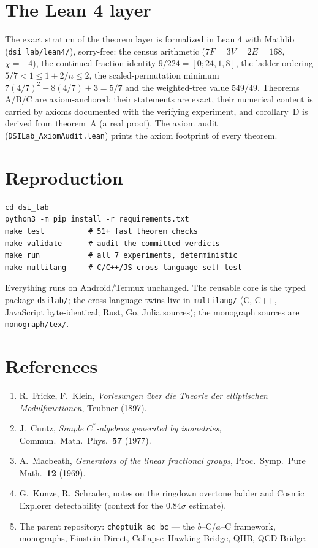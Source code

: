 \documentclass[11pt,a4paper]{article}
\theoremstyle{definition}
\begin{document}
\section{The Lean 4 layer}\label{sec:lean}

The exact stratum of the theorem layer is formalized in Lean 4 with
Mathlib (\texttt{dsi\_lab/lean4/}), sorry-free: the census arithmetic
($7F = 3V = 2E = 168$, $\chi = -4$), the continued-fraction identity
$9/224 = [0;24,1,8]$, the ladder ordering $5/7 < 1 \le 1 + 2/n \le 2$,
the scaled-permutation minimum $7(4/7)^2 - 8(4/7) + 3 = 5/7$ and the
weighted-tree value $549/49$. Theorems A/B/C are axiom-anchored: their
statements are exact, their numerical content is carried by axioms
documented with the verifying experiment, and corollary~D is derived
from theorem~A (a real proof). The axiom audit
(\texttt{DSILab\_AxiomAudit.lean}) prints the axiom footprint of every
theorem.

\section{Reproduction}\label{sec:repro}

\begin{verbatim}
cd dsi_lab
python3 -m pip install -r requirements.txt
make test          # 51+ fast theorem checks
make validate      # audit the committed verdicts
make run           # all 7 experiments, deterministic
make multilang     # C/C++/JS cross-language self-test
\end{verbatim}
Everything runs on Android/Termux unchanged. The reusable core is the
typed package \texttt{dsilab/}; the cross-language twins live in
\texttt{multilang/} (C, C++, JavaScript byte-identical; Rust, Go, Julia
sources); the monograph sources are \texttt{monograph/tex/}.

\section*{References}
\begin{enumerate}
\item R.~Fricke, F.~Klein, \emph{Vorlesungen \"{u}ber die Theorie der elliptischen Modulfunctionen}, Teubner (1897).
\item J.~Cuntz, \emph{Simple $C^*$-algebras generated by isometries}, Commun.\ Math.\ Phys.\ \textbf{57} (1977).
\item A.~Macbeath, \emph{Generators of the linear fractional groups}, Proc.\ Symp.\ Pure Math.\ \textbf{12} (1969).
\item G.~Kunze, R.~Schrader, notes on the ringdown overtone ladder and Cosmic Explorer detectability (context for the $0.84\sigma$ estimate).
\item The parent repository: \texttt{choptuik\_ac\_bc} --- the $b$--C/$a$--C framework, monographs, Einstein Direct, Collapse--Hawking Bridge, QHB, QCD Bridge.
\end{enumerate}
\end{document}
